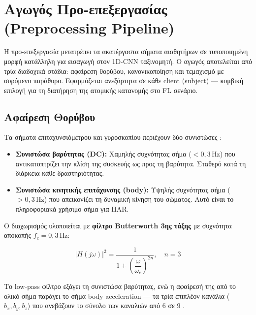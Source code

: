 
\section{Αγωγός Προ-επεξεργασίας (Preprocessing Pipeline)}
\label{sec:preprocessing}

Η προ-επεξεργασία μετατρέπει τα ακατέργαστα σήματα αισθητήρων σε
τυποποιημένη μορφή κατάλληλη για εισαγωγή στον 1D-CNN ταξινομητή.
Ο αγωγός αποτελείται από τρία διαδοχικά στάδια: αφαίρεση θορύβου,
κανονικοποίηση και τεμαχισμό με συρόμενο παράθυρο. Εφαρμόζεται
ανεξάρτητα σε κάθε client (subject) — κομβική επιλογή για τη
διατήρηση της ατομικής κατανομής στο FL σενάριο.

\subsection{Αφαίρεση Θορύβου}
\label{subsec:denoising}

Τα σήματα επιταχυνσιόμετρου και γυροσκοπίου περιέχουν δύο
συνιστώσες \cite{Anguita2013}:

\begin{itemize}
    \item \textbf{Συνιστώσα βαρύτητας (DC):} Χαμηλής συχνότητας
    σήμα ($< 0{,}3\,\text{Hz}$) που αντικατοπτρίζει την κλίση
    της συσκευής ως προς τη βαρύτητα. Σταθερό κατά τη διάρκεια
    κάθε δραστηριότητας.

    \item \textbf{Συνιστώσα κινητικής επιτάχυνσης (body):}
    Υψηλής συχνότητας σήμα ($> 0{,}3\,\text{Hz}$) που απεικονίζει
    τη δυναμική κίνηση του σώματος. Αυτό είναι το πληροφοριακά
    χρήσιμο σήμα για HAR.
\end{itemize}

Ο διαχωρισμός υλοποιείται με \textbf{φίλτρο Butterworth 3ης
τάξης} με συχνότητα αποκοπής $f_c = 0{,}3\,\text{Hz}$:

\begin{equation}
    \label{eq:butterworth}
    |H(j\omega)|^2 = \frac{1}{1 + \left(\dfrac{\omega}{\omega_c}\right)^{2n}},
    \quad n = 3
\end{equation}

\noindent Το low-pass φίλτρο εξάγει τη συνιστώσα βαρύτητας, ενώ
η αφαίρεσή της από το ολικό σήμα παράγει το σήμα body acceleration
— τα τρία επιπλέον κανάλια ($b_x, b_y, b_z$) που ανεβάζουν το
σύνολο των καναλιών από 6 σε 9 \cite{Anguita2013}.

